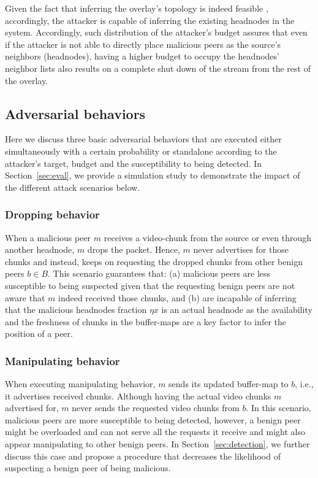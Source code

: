 Given the fact that inferring the overlay's topology is indeed feasible \cite{nguyen2016swap,rbcs}, accordingly, the attacker is capable of inferring the existing headnodes in the system.
Accordingly, such distribution of the attacker's budget assures that even if the attacker is not able to directly place malicious peers as the source's neighbors (headnodes), having a higher budget to occupy the headnodes' neighbor lists also results on a complete shut down of the stream from the rest of the overlay.

\subsection{Adversarial behaviors}
Here we discuss three basic adversarial behaviors that are executed either simultaneously with a certain probability or standalone according to the attacker's target, budget and the susceptibility to being detected.
In Section~\ref{sec:eval}, we provide a simulation study to demonstrate the impact of the different attack scenarios below.

\subsubsection*{Dropping behavior}
When a malicious peer $m$ receives a video-chunk from the source or even through another headnode, $m$ drops the packet. 
Hence, $m$ never advertises for those chunks and instead, keeps on requesting the dropped chunks from other benign peers $b \in B$.
This scenario guarantees that: (a) malicious peers are less susceptible to being suspected given that the requesting benign peers are not aware that $m$ indeed received those chunks,
and (b) are incapable of inferring that the malicious headnodes fraction $\eta x$ is an actual headnode as the availability and the freshness of chunks in the buffer-maps are a key factor to infer the position of a peer.

\subsubsection*{Manipulating behavior}
When executing manipulating behavior, $m$ sends its updated buffer-map to $b$, i.e., it advertises received chunks. 
Although having the actual video chunks $m$ advertised for, $m$ never sends the requested video chunks from $b$.
In this scenario, malicious peers are more susceptible to being detected, however, a benign peer might be overloaded and can not serve all the requests it receive and might also appear manipulating to other benign peers.
In Section~\ref{sec:detection}, we further discuss this case and propose a procedure that decreases the likelihood of suspecting a benign peer of being malicious.

